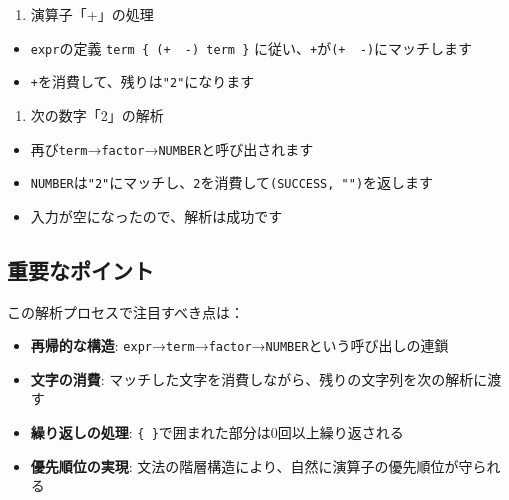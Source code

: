 \begin{enumerate}
\def\labelenumi{\arabic{enumi}.}
\setcounter{enumi}{1}
\tightlist
\item
  演算子「+」の処理
\end{enumerate}

\begin{itemize}
\tightlist
\item
  \texttt{expr}の定義
  \texttt{term\ \{\ (\textquotesingle{}+\textquotesingle{}\ \textbar{}\ \textquotesingle{}-\textquotesingle{})\ term\ \}}
  に従い、\texttt{+}が\texttt{(\textquotesingle{}+\textquotesingle{}\ \textbar{}\ \textquotesingle{}-\textquotesingle{})}にマッチします
\item
  \texttt{+}を消費して、残りは\texttt{"2"}になります
\end{itemize}

\begin{enumerate}
\def\labelenumi{\arabic{enumi}.}
\setcounter{enumi}{2}
\tightlist
\item
  次の数字「2」の解析
\end{enumerate}

\begin{itemize}
\tightlist
\item
  再び\texttt{term}→\texttt{factor}→\texttt{NUMBER}と呼び出されます
\item
  \texttt{NUMBER}は\texttt{"2"}にマッチし、\texttt{2}を消費して\texttt{(SUCCESS,\ "")}を返します
\item
  入力が空になったので、解析は成功です
\end{itemize}

\hypertarget{chapter2-ux91cdux8981ux306aux30ddux30a4ux30f3ux30c8}{%
\subsection{重要なポイント}\label{chapter2-ux91cdux8981ux306aux30ddux30a4ux30f3ux30c8}}

この解析プロセスで注目すべき点は：

\begin{itemize}
\tightlist
\item
  \textbf{再帰的な構造}:
  \texttt{expr}→\texttt{term}→\texttt{factor}→\texttt{NUMBER}という呼び出しの連鎖
\item
  \textbf{文字の消費}:
  マッチした文字を消費しながら、残りの文字列を次の解析に渡す
\item
  \textbf{繰り返しの処理}:
  \texttt{\{\ \}}で囲まれた部分は0回以上繰り返される
\item
  \textbf{優先順位の実現}:
  文法の階層構造により、自然に演算子の優先順位が守られる
\end{itemize}

